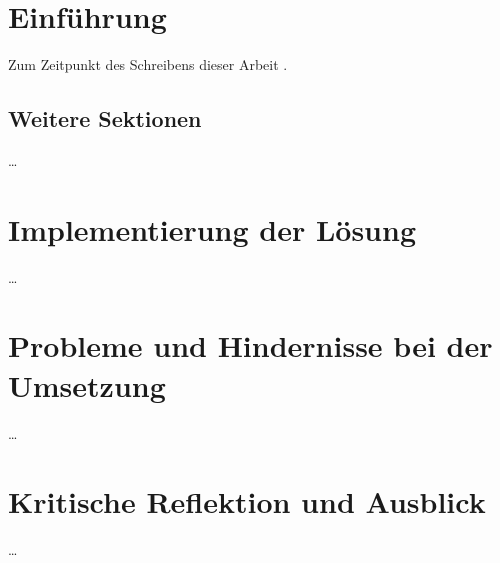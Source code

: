\documentclass[12pt,a4paper]{article}
\begin{document}
\newpage
{}
\section{Einführung}
Zum Zeitpunkt des Schreibens dieser Arbeit \parencite[vgl.][]{assembly_in_dotnet}.

\subsection{Weitere Sektionen}
\dots

\section{Implementierung der Lösung}
\dots

\section{Probleme und Hindernisse bei der Umsetzung}
\dots

\section{Kritische Reflektion und Ausblick}
\dots

\newpage
{}
\small
\printbibliography	
\end{document}
